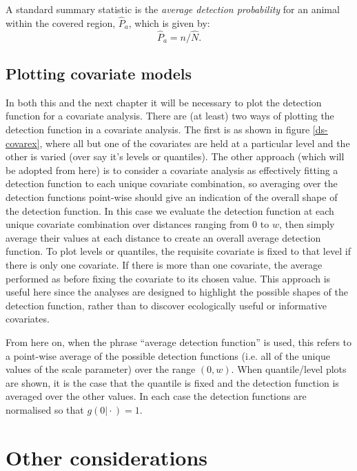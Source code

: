 A standard summary statistic is the \textit{average detection probability} for an animal within the covered region, $\hat{P}_a$, which is given by:
\begin{equation*}
\hat{P}_a = n/\hat{N}.
\end{equation*}

\subsection{Plotting covariate models}
\label{ds-covplot}

\label{cor-8s12-1}In both this and the next chapter it will be necessary to plot the detection function for a covariate analysis. There are (at least) two ways of plotting the detection function in a covariate analysis. The first is as shown in figure \ref{ds-covarex}, where all but one of the covariates are held at a particular level and the other is varied (over say it's levels or quantiles). The other approach (which will be adopted from here) is to consider a covariate analysis as effectively fitting a detection function to each unique covariate combination, so averaging over the detection functions point-wise should give an indication of the overall shape of the detection function. In this case we evaluate the detection function at each unique covariate combination over distances ranging from 0 to $w$, then simply average their values at each distance to create an overall average detection function. To plot levels or quantiles, the requisite covariate is fixed to that level if there is only one covariate. If there is more than one covariate, the average performed as before fixing the covariate to its chosen value. This approach is useful here since the analyses are designed to highlight the possible shapes of the detection function, rather than to discover ecologically useful or informative covariates. 

From here on, when the phrase ``average detection function'' is used, this refers to a point-wise average of the possible detection functions (i.e. all of the unique values of the scale parameter) over the range $(0,w)$. When quantile/level plots are shown, it is the case that the quantile is fixed and the detection function is averaged over the other values. In each case the detection functions are normalised so that $g(0\vert\cdot)=1$.

\section{Other considerations}


